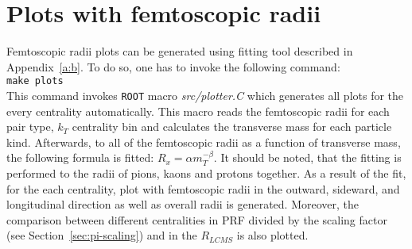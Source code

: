   \section{Plots with femtoscopic radii}
    Femtoscopic radii plots can be generated using fitting tool described in Appendix~\ref{a:b}.
    To do so, one has to invoke the following command:\\
    \verb|make plots|\\
    This command invokes \verb|ROOT| macro \textit{src/plotter.C} which generates all plots for the every centrality automatically.
    This macro reads the femtoscopic radii for each pair type, $k_T$ centrality bin and calculates the transverse mass for each particle kind.
    Afterwards, to all of the femtoscopic radii as a function of transverse mass, the following formula is fitted: $R_x=\alpha m_T^{-\beta}$.
    It should be noted, that the fitting is performed to the radii of pions, kaons and protons together.
    As a result of the fit, for the each centrality, plot with femtoscopic radii in the outward, sideward, and longitudinal direction as well as overall radii is generated.
    Moreover, the comparison between different centralities in PRF divided by the scaling factor (see Section~\ref{sec:pi-scaling}) and in the $R_{LCMS}$ is also plotted.


